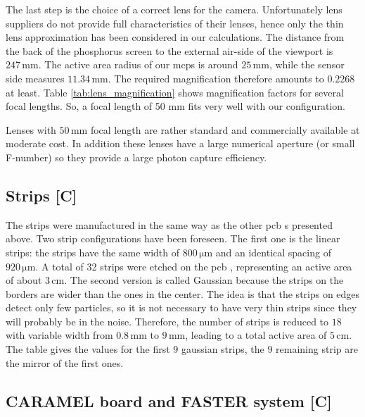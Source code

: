 \begin{refsection}
  The last step is the choice of a correct lens for the camera.
  Unfortunately lens suppliers do not provide full characteristics of their lenses, hence only the thin lens approximation has been considered in our calculations. The distance from the back of the phosphorus screen to the external air-side of the viewport is $247\,\mathrm{mm}$. The active area radius of our \acrshort{mcp}s is around $25\,\mathrm{mm}$, while the sensor side measures $11.34\,\mathrm{mm}$. The required magnification therefore amounts to $0.2268$ at least.
  Table \ref{tab:lens_magnification} shows magnification factors for several focal lengths. So, a focal length of 50 mm fits very well with our configuration.
  

  Lenses with $50\,\mathrm{mm}$ focal length are rather standard and commercially available at moderate cost. In addition these lenses have a large numerical aperture (or small F-number) so they provide a large photon capture efficiency.

  \subsection{Strips [C]}
  The strips were manufactured in the same way as the other \acrshort{pcb} s presented above. Two strip configurations have been foreseen. The first one is the linear strips: the strips have the same width of $800\,\mathrm{\mu m}$ and an identical spacing of $920\,\mathrm{\mu m}$. A total of 32 strips were etched on the \acrshort{pcb} , representing an active area of about $3\,\mathrm{cm}$. The second version is called Gaussian because the strips on the borders are wider than the ones in the center. The idea is that the strips on edges detect only few particles, so it is not necessary to have very thin strips since they will probably be in the noise. Therefore, the number of strips is reduced to $18$ with variable width from $0.8\,\mathrm{mm}$ to $9\,\mathrm{mm}$, leading to a total active area of $5\,\mathrm{cm}$. The table gives the values for the first $9$ gaussian strips, the $9$ remaining strip are the mirror of the first ones.

  

  \subsection{CARAMEL board and FASTER system [C]}


\end{refsection}
